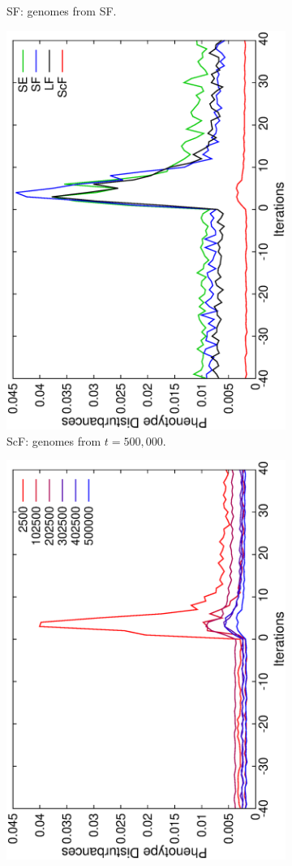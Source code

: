 \begin{figure}[h]
\begin{subfigure}{.25\textwidth}
 \caption{SF: genomes from SF.}
 \label{fig:transli}
\end{subfigure}
\begin{subfigure}{.25\textwidth}
 \centering
 \includegraphics[width=.7\linewidth, angle =-90]{img/Sucavg499999variationSmallb.eps}
 \caption{ScF: genomes from $t\!=\!500,000$.}
 \label{fig:transstest}
\end{subfigure}%
\begin{subfigure}{.25\textwidth}
 \centering
 \includegraphics[width=.7\linewidth, angle =-90]{img/SucavgvarSmallValidvariationSmallb.eps}

\end{subfigure}
\end{figure}

